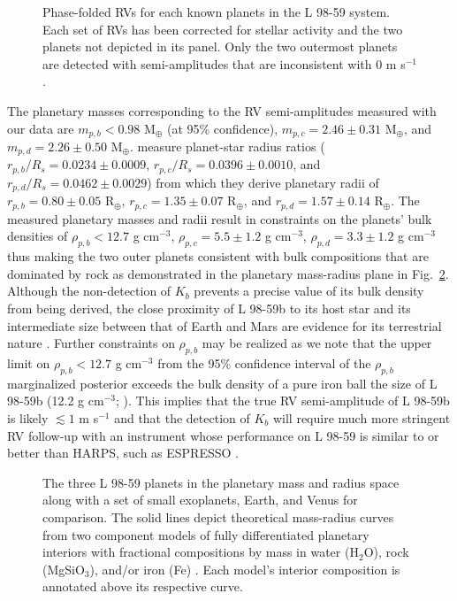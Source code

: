 \documentclass[longauth]{aa}
\newcommand{\mps}{m s$^{-1}$}
\newcommand{\gcm}{g cm$^{-3}$}
\begin{document}
\begin{figure}
    \centering
    \caption{Phase-folded RVs for each known planets in the L 98-59 system. Each set of RVs has been corrected for stellar activity and the two planets not depicted in its panel. Only the two outermost planets are detected with semi-amplitudes that are inconsistent with 0 \mps{.}}
    \label{fig:rvphased}
\end{figure}

The planetary masses corresponding to the RV semi-amplitudes measured with our data are $m_{p,b} < 0.98$ M$_{\oplus}$ (at 95\% confidence), $m_{p,c}=2.46\pm 0.31$ M$_{\oplus}$, and $m_{p,d}=2.26\pm 0.50$ M$_{\oplus}$.  measure planet-star radius ratios ($r_{p,b}/R_s=0.0234\pm 0.0009$, $r_{p,c}/R_s=0.0396\pm 0.0010$, and $r_{p,d}/R_s=0.0462\pm 0.0029$) from which they derive planetary radii of $r_{p,b}=0.80\pm 0.05$ R$_{\oplus}$, $r_{p,c}=1.35\pm 0.07$ R$_{\oplus}$, and $r_{p,d}=1.57\pm 0.14$ R$_{\oplus}$. The measured planetary masses and radii result in constraints on the planets' bulk densities of $\rho_{p,b}<12.7$ \gcm{,} $\rho_{p,c}=5.5\pm 1.2$ \gcm{,} $\rho_{p,d}=3.3\pm 1.2$ \gcm{} thus making the two outer planets consistent with bulk compositions that are dominated by rock as demonstrated in the planetary mass-radius plane in Fig.~\ref{fig:MR}. Although the non-detection of $K_b$ prevents a precise value of its bulk density from being derived, the close proximity of L 98-59b to its host star and its intermediate size between that of Earth and Mars are evidence for its terrestrial nature \citep{owen13,jin14,lopez14,chen16,lopez16,owen17}. Further constraints on $\rho_{p,b}$ may be realized as we note that the upper limit on $\rho_{p,b}<12.7$ \gcm{} from the 95\% confidence interval of the $\rho_{p,b}$ marginalized posterior exceeds the bulk density of a pure iron ball the size of L 98-59b (12.2 \gcm{;} \citealt{zeng13}). This implies that the true RV semi-amplitude of L 98-59b is likely $\lesssim 1$ \mps{} and that the detection of $K_b$ will require much more stringent RV follow-up with an instrument whose performance on L 98-59 is similar to or better than HARPS, such as ESPRESSO \citep{pepe10}.

\begin{figure}
    \centering
    \caption{The three L 98-59 planets in the planetary mass and radius space along with a set of small exoplanets, Earth, and Venus for comparison. The solid lines depict theoretical mass-radius curves from two component models of fully differentiated planetary interiors with fractional compositions by mass in water (H$_2$O), rock (MgSiO$_3$), and/or iron (Fe) \citep{zeng13}. Each model's interior composition is annotated above its respective curve.}
    \label{fig:MR}
\end{figure}
\end{document}
